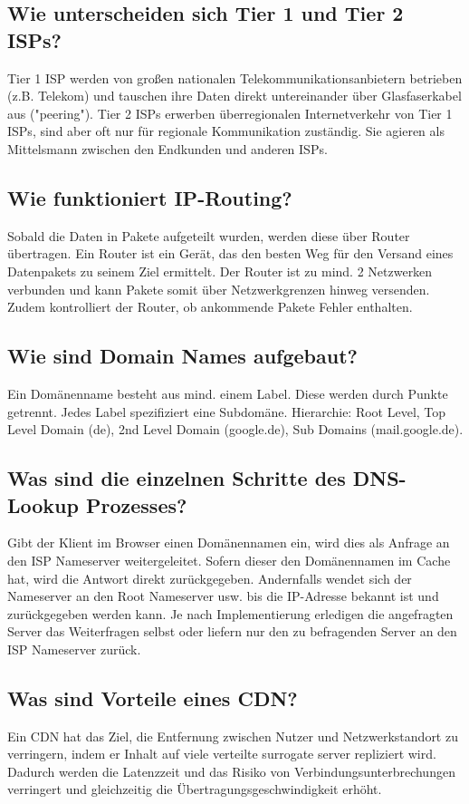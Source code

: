 \documentclass{article}
\begin{document}
\subsection{Wie unterscheiden sich Tier 1 und Tier 2 ISPs?}
Tier 1 ISP werden von großen nationalen Telekommunikationsanbietern betrieben (z.B. Telekom) und tauschen ihre Daten direkt untereinander über Glasfaserkabel aus ("peering"). Tier 2 ISPs erwerben überregionalen Internetverkehr von Tier 1 ISPs, sind aber oft nur für regionale Kommunikation zuständig. Sie agieren als Mittelsmann zwischen den Endkunden und anderen ISPs.
\subsection{Wie funktioniert IP-Routing?}
Sobald die Daten in Pakete aufgeteilt wurden, werden diese über Router übertragen. Ein Router ist ein Gerät, das den besten Weg für den Versand eines Datenpakets zu seinem Ziel ermittelt. Der Router ist zu mind. 2 Netzwerken verbunden und kann Pakete somit über Netzwerkgrenzen hinweg versenden. Zudem kontrolliert der Router, ob ankommende Pakete Fehler enthalten. 
\subsection{Wie sind Domain Names aufgebaut?}
Ein Domänenname besteht aus mind. einem Label. Diese werden durch Punkte getrennt. Jedes Label spezifiziert eine Subdomäne. Hierarchie: Root Level, Top Level Domain (de), 2nd Level Domain (google.de), Sub Domains (mail.google.de).
\subsection{Was sind die einzelnen Schritte des DNS-Lookup Prozesses?}
Gibt der Klient im Browser einen Domänennamen ein, wird dies als Anfrage an den ISP Nameserver weitergeleitet. Sofern dieser den Domänennamen im Cache hat, wird die Antwort direkt zurückgegeben. 
Andernfalls wendet sich der Nameserver an den Root Nameserver usw. bis die IP-Adresse bekannt ist und zurückgegeben werden kann. Je nach Implementierung erledigen die angefragten Server das Weiterfragen selbst oder liefern nur den zu befragenden Server an den ISP Nameserver zurück.
\subsection{Was sind Vorteile eines CDN?}
Ein CDN hat das Ziel, die Entfernung zwischen Nutzer und Netzwerkstandort zu verringern, indem er Inhalt auf viele verteilte surrogate server repliziert wird. Dadurch werden die Latenzzeit und das Risiko von Verbindungsunterbrechungen verringert und gleichzeitig die Übertragungsgeschwindigkeit erhöht.
\end{document}
